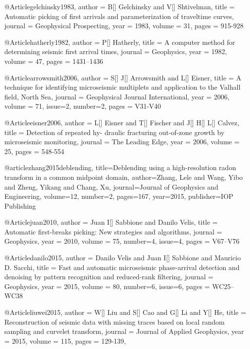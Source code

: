     @Article{gelchinsky1983,
  author = 	 {B[] Gelchinsky and V[] Shtivelman},
  title = 	 {Automatic picking of first arrivals and parameterization of traveltime curves},
  journal = 	 {Geophysical Prospecting},
  year = 	 1983,
  volume = 	 31,
  pages = 	 {915-928}} 

    @Article{hatherly1982,
  author = 	 {P[] Hatherly},
  title = 	 {A computer method for determining seismic first arrival times},
  journal = 	 {Geophysics},
  year = 	 1982,
  volume = 	 47,
  pages = 	 {1431–1436}} 
    
   @Article{arrowsmith2006,
  author = 	 {S[] J[] Arrowsmith and L[] Eisner},
  title = 	 {A technique for identifying microseismic multiplets and application to the Valhall field, North Sea},
  journal = 	 {Geophysical Journal International},
  year = 	 2006,
  volume = 	 71,
  issue=2,
  number=2,
  pages = 	 {V31-V40}} 
  
    @Article{eisner2006,
  author = 	 {L[] Eisner and T[] Fischer and J[] H[] L[] Calvez},
  title = 	 {Detection of repeated hy- draulic fracturing  out-of-zone growth  by microseismic monitoring},
  journal = 	 {The Leading Edge},
  year = 	 2006,
  volume = 	 25,
  pages = 	 {548-554}}
  
  @article{zhang2015deblending,
  title={Deblending using a high-resolution radon transform in a common midpoint domain},
  author={Zhang, Lele and Wang, Yibo and Zheng, Yikang and Chang, Xu},
  journal={Journal of Geophysics and Engineering},
  volume={12},
  number={2},
  pages={167},
  year={2015},
  publisher={IOP Publishing}
}

    @Article{juan2010,
  author = 	 {Juan I[] Sabbione and Danilo Velis},
  title = 	 {Automatic first-breaks picking: New strategies and algorithms},
  journal = 	 {Geophysics},
  year = 	 2010,
  volume = 	 75,
  number=4,
  issue=4,
  pages = 	 {V67–V76}} 
  
      @Article{danilo2015,
  author = 	 {Danilo Velis and Juan I[] Sabbione and Mauricio D. Sacchi},
  title = 	 {Fast and automatic microseismic phase-arrival detection and denoising by pattern recognition and reduced-rank filtering},
  journal = 	 {Geophysics},
  year = 	 2015,
  volume = 	 80,
  number=6,
  issue=6,
  pages = 	 {WC25–WC38}} 
  
  
@Article{liuwei2015,
  author = 	 {W[] Liu and S[] Cao and G[] Li and Y[] He},
  title = 	 {Reconstruction of seismic data with missing traces based on local random sampling and curvelet transform},
  journal = 	 {Journal of Applied Geophysics},
  year = 	 2015,
  volume = 115,
  pages =	 {129-139},
}

